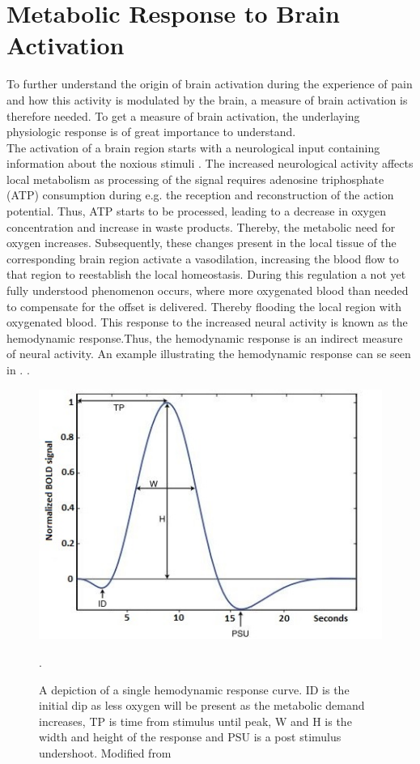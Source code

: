 
\section{Metabolic Response to Brain Activation} \label{sec:pain}

To further understand the origin of brain activation during the experience of pain and how this activity is modulated by the brain, a measure of brain activation is therefore needed. To get a measure of brain activation, the underlaying physiologic response is of great importance to understand. \\
The activation of a brain region starts with a neurological input containing information about the noxious stimuli \cite{Tracey2007}. The increased neurological activity affects local metabolism as processing of the signal requires adenosine triphosphate (ATP) consumption during e.g. the reception and reconstruction of the action potential. Thus, ATP starts to be processed, leading to a decrease in oxygen concentration and increase in waste products. Thereby, the metabolic need for oxygen increases. Subsequently, these changes present in the local tissue of the corresponding brain region activate a vasodilation, increasing the blood flow to that region to reestablish the local homeostasis. During this regulation a not yet fully understood phenomenon occurs, where more oxygenated blood than needed to compensate for the offset is delivered. Thereby flooding the local region with oxygenated blood. This response to the increased neural activity is known as the hemodynamic response.Thus, the hemodynamic response is an indirect measure of neural activity.  %
An example illustrating the hemodynamic response can se seen in . \cite{Glover2011,Poldrack2011}.

\begin{figure}[H]                 
	\includegraphics[width=.48\textwidth]{figures/aBackground/HRF}  
	\caption{A depiction of a single hemodynamic response curve. ID is the initial dip as less oxygen will be present as the metabolic demand increases, TP is time from stimulus until peak, W and H is the width and height of the response and PSU is a post stimulus undershoot. Modified from \cite{Poldrack2011}}.
	\label{fig:back:HRF} 
\end{figure}

